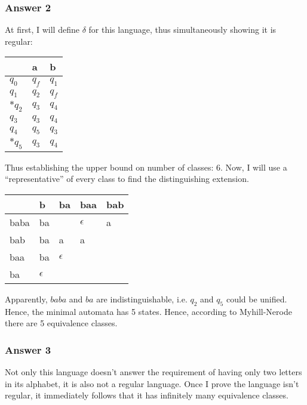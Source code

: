\documentclass[11pt]{article}
\begin{document}
\subsubsection{Answer 2}
\label{sec:orgheadline2}
At first, I will define \(\delta\) for this language, thus simultaneously
showing it is regular:

\begin{center}
\begin{tabular}{lll}
 & a & b\\
\hline
\(q_0\) & \(q_f\) & \(q_1\)\\
\(q_1\) & \(q_2\) & \(q_f\)\\
\(*q_2\) & \(q_3\) & \(q_4\)\\
\(q_3\) & \(q_3\) & \(q_4\)\\
\(q_4\) & \(q_5\) & \(q_3\)\\
\(*q_5\) & \(q_3\) & \(q_4\)\\
\end{tabular}
\end{center}

Thus establishing the upper bound on number of classes: 6.  Now, I will use
a ``representative'' of every class to find the distinguishing extension.

\begin{center}
\begin{tabular}{lllll}
 & b & ba & baa & bab\\
\hline
baba & ba &  & \(\epsilon\) & a\\
bab & ba & a & a & \\
baa & ba & \(\epsilon\) &  & \\
ba & \(\epsilon\) &  &  & \\
\end{tabular}
\end{center}

Apparently, \(baba\) and \(ba\) are indistinguishable, i.e. \(q_2\) and \(q_5\)
could be unified.  Hence, the minimal automata has 5 states.  Hence,
according to Myhill-Nerode there are 5 equivalence classes.

\subsubsection{Answer 3}
\label{sec:orgheadline3}
Not only this language doesn't answer the requirement of having only two
letters in its alphabet, it is also not a regular language.  Once I prove
the language isn't regular, it immediately follows that it has infinitely
many equivalence classes.
\end{document}
